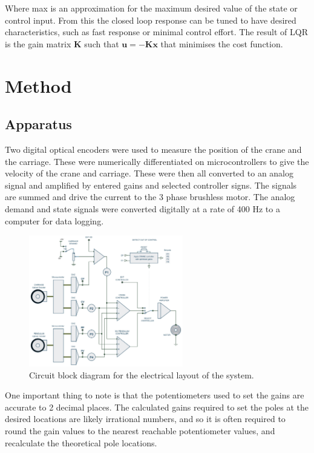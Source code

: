 \documentclass{article}
\begin{document}
Where max is an approximation for the maximum desired value of the state or control input.
From this the closed loop response can be tuned to have desired characteristics, such as fast response or minimal control effort.
The result of LQR is the gain matrix $\mathbf{K}$ such that $\mathbf{u} = -\mathbf{Kx}$ that minimises the cost function.

\section{Method}

\subsection{Apparatus}

Two digital optical encoders were used to measure the position of the crane and the carriage.
These were numerically differentiated on microcontrollers to give the velocity of the crane and carriage.
These were then all converted to an analog signal and amplified by entered gains and selected controller signs.
The signals are summed and drive the current to the 3 phase brushless motor. 
The analog demand and state signals were converted digitally at a rate of 400 Hz to a computer for data logging. 

\begin{figure}[H]
  \centering
  \includegraphics[width=0.6\textwidth]{figures/electrical_layout.png}
  \caption{Circuit block diagram for the electrical layout of the system.}
  \label{fig:electrical_layout}
\end{figure}

One important thing to note is that the potentiometers used to set the gains are accurate to 2 decimal places.
The calculated gains required to set the poles at the desired locations are likely irrational numbers, and so
it is often required to round the gain values to the nearest reachable potentiometer values, and recalculate 
the theoretical pole locations.
\end{document}
